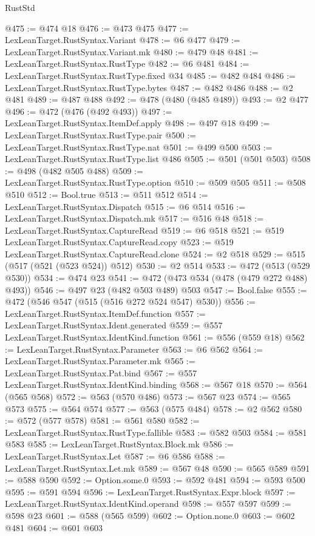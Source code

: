 \begin{lexlean}{RustStd}
\begin{coremodule}
@475 := @474 @18
@476 := @473 @475
@477 := LexLeanTarget.RustSyntax.Variant
@478 := @6 @477
@479 := LexLeanTarget.RustSyntax.Variant.mk
@480 := @479 @48
@481 := LexLeanTarget.RustSyntax.RustType
@482 := @6 @481
@484 := LexLeanTarget.RustSyntax.RustType.fixed @34
@485 := @482 @484
@486 := LexLeanTarget.RustSyntax.RustType.bytes
@487 := @482 @486
@488 := @2 @481
@489 := @487 @488
@492 := @478 (@480 (@485 @489))
@493 := @2 @477
@496 := @472 (@476 (@492 @493))
@497 := LexLeanTarget.RustSyntax.ItemDef.apply
@498 := @497 @18
@499 := LexLeanTarget.RustSyntax.RustType.pair
@500 := LexLeanTarget.RustSyntax.RustType.nat
@501 := @499 @500
@503 := LexLeanTarget.RustSyntax.RustType.list @486
@505 := @501 (@501 @503)
@508 := @498 (@482 @505 @488)
@509 := LexLeanTarget.RustSyntax.RustType.option
@510 := @509 @505
@511 := @508 @510
@512 := Bool.true
@513 := @511 @512
@514 := LexLeanTarget.RustSyntax.Dispatch
@515 := @6 @514
@516 := LexLeanTarget.RustSyntax.Dispatch.mk
@517 := @516 @48
@518 := LexLeanTarget.RustSyntax.CaptureRead
@519 := @6 @518
@521 := @519 LexLeanTarget.RustSyntax.CaptureRead.copy
@523 := @519 LexLeanTarget.RustSyntax.CaptureRead.clone
@524 := @2 @518
@529 := @515 (@517 (@521 (@523 @524)) @512)
@530 := @2 @514
@533 := @472 (@513 (@529 @530))
@534 := @474 @23
@541 := @472 (@473 @534 (@478 (@479 @272 @488) @493))
@546 := @497 @23 (@482 @503 @489) @503
@547 := Bool.false
@555 := @472 (@546 @547 (@515 (@516 @272 @524 @547) @530))
@556 := LexLeanTarget.RustSyntax.ItemDef.function
@557 := LexLeanTarget.RustSyntax.Ident.generated
@559 := @557 LexLeanTarget.RustSyntax.IdentKind.function
@561 := @556 (@559 @18)
@562 := LexLeanTarget.RustSyntax.Parameter
@563 := @6 @562
@564 := LexLeanTarget.RustSyntax.Parameter.mk
@565 := LexLeanTarget.RustSyntax.Pat.bind
@567 := @557 LexLeanTarget.RustSyntax.IdentKind.binding
@568 := @567 @18
@570 := @564 (@565 @568)
@572 := @563 (@570 @486)
@573 := @567 @23
@574 := @565 @573
@575 := @564 @574
@577 := @563 (@575 @484)
@578 := @2 @562
@580 := @572 (@577 @578)
@581 := @561 @580
@582 := LexLeanTarget.RustSyntax.RustType.fallible
@583 := @582 @503
@584 := @581 @583
@585 := LexLeanTarget.RustSyntax.Block.mk
@586 := LexLeanTarget.RustSyntax.Let
@587 := @6 @586
@588 := LexLeanTarget.RustSyntax.Let.mk
@589 := @567 @48
@590 := @565 @589
@591 := @588 @590
@592 := Option.some.{0}
@593 := @592 @481
@594 := @593 @500
@595 := @591 @594
@596 := LexLeanTarget.RustSyntax.Expr.block
@597 := LexLeanTarget.RustSyntax.IdentKind.operand
@598 := @557 @597
@599 := @598 @23
@601 := @588 (@565 @599)
@602 := Option.none.{0}
@603 := @602 @481
@604 := @601 @603

\end{coremodule}
\end{lexlean}
